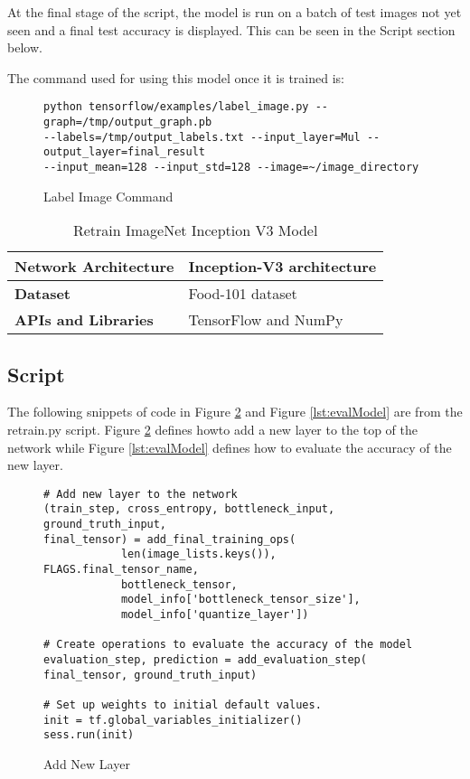 At the final stage of the script, the model is run on a batch of test images not
yet seen and a final test accuracy is displayed. This can be seen in the Script
section below.

The command used for using this model once it is trained is:
\begin{figure}
\caption{Label Image Command}
\label{lst:labelImage}
\begin{lstlisting}[style=Command]
python tensorflow/examples/label_image.py --graph=/tmp/output_graph.pb
--labels=/tmp/output_labels.txt --input_layer=Mul --output_layer=final_result
--input_mean=128 --input_std=128 --image=~/image_directory
\end{lstlisting}
\end{figure}

\begin{table}[h]
\centering
\caption{Retrain ImageNet Inception V3 Model}
\label{my-label}
\begin{tabular}{|l|p{8cm}|}
\hline
\textbf{Network Architecture} & Inception-V3 architecture \parencite{inception}            \\ \hline
\textbf{Dataset}              & Food-101 dataset \\ \hline
\textbf{APIs and Libraries}   & TensorFlow and NumPy                                                        \\ \hline
\end{tabular}
\end{table}

\tocless\subsection{Script}
The following snippets of code in Figure \ref{lst:addNewLayer} and Figure \ref{lst:evalModel} are from the retrain.py script.
Figure \ref{lst:addNewLayer} defines howto add a new layer to the top of the network while Figure \ref{lst:evalModel} defines how to evaluate the accuracy of the new layer. 

\begin{figure}
\caption{Add New Layer \parencite{retrainInception}}
\label{lst:addNewLayer}
\begin{lstlisting}[style=Python]
# Add new layer to the network
(train_step, cross_entropy, bottleneck_input, ground_truth_input,
final_tensor) = add_final_training_ops(
            len(image_lists.keys()), FLAGS.final_tensor_name,
            bottleneck_tensor,
            model_info['bottleneck_tensor_size'],
            model_info['quantize_layer'])
 
# Create operations to evaluate the accuracy of the model
evaluation_step, prediction = add_evaluation_step(
final_tensor, ground_truth_input)
 
# Set up weights to initial default values.
init = tf.global_variables_initializer()
sess.run(init)
\end{lstlisting}
\end{figure}

